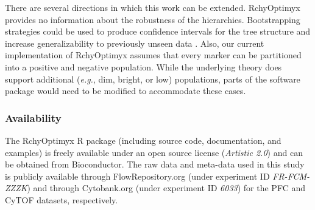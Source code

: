 There are several directions in which this work can be extended.
RchyOptimyx provides no information about the robustness of the hierarchies.
Bootstrapping strategies could be used to produce confidence intervals for the tree structure and increase generalizability to previously unseen data \cite{suzuki2006pvclust}.
Also, our current implementation of RchyOptimyx assumes that every marker can be partitioned into a positive and negative population.
While the underlying theory does support additional (\emph{e.g.}, dim, bright, or low) populations, parts of the software package would need to be modified to accommodate these cases.


\subsubsection{Availability}
The RchyOptimyx R package (including source code, documentation, and examples) is freely available under an open source license (\emph{Artistic 2.0}) and can be obtained from Bioconductor.
The raw data and meta-data used in this study is publicly available through FlowRepository.org (under experiment ID \emph{FR-FCM-ZZZK}) and through Cytobank.org (under experiment ID \emph{6033}) for the PFC and CyTOF datasets, respectively.








